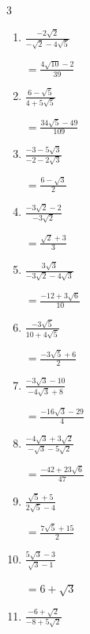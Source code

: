 \begin{multicols}{3}
\begin{enumerate}
        $\displaystyle =\frac{7\sqrt{2}-9}{5}$

  \item $\displaystyle \frac{-2\sqrt{2}}{-\sqrt{2}-4\sqrt{5}}$

        $\displaystyle =\frac{4\sqrt{10}-2}{39}$

\columnbreak %

\resetques

  \item $\displaystyle \frac{6-\sqrt{5}}{4+5\sqrt{5}}$

        $\displaystyle =\frac{34\sqrt{5}-49}{109}$

  \item $\displaystyle \frac{-3-5\sqrt{3}}{-2-2\sqrt{3}}$

        $\displaystyle =\frac{6-\sqrt{3}}{2}$

  \item $\displaystyle \frac{-3\sqrt{2}-2}{-3\sqrt{2}}$

        $\displaystyle =\frac{\sqrt{2}+3}{3}$

  \item $\displaystyle \frac{3\sqrt{3}}{-3\sqrt{2}-4\sqrt{3}}$

        $\displaystyle =\frac{-12+3\sqrt{6}}{10}$

  \item $\displaystyle \frac{-3\sqrt{5}}{10+4\sqrt{5}}$

        $\displaystyle =\frac{-3\sqrt{5}+6}{2}$

\columnbreak %

  \item $\displaystyle \frac{-3\sqrt{3}-10}{-4\sqrt{3}+8}$

        $\displaystyle =\frac{-16\sqrt{3}-29}{4}$

  \item $\displaystyle \frac{-4\sqrt{3}+3\sqrt{2}}{-\sqrt{3}-5\sqrt{2}}$

        $\displaystyle =\frac{-42+23\sqrt{6}}{47}$

  \item $\displaystyle \frac{\sqrt{5}+5}{2\sqrt{5}-4}$

        $\displaystyle =\frac{7\sqrt{5}+15}{2}$

  \item $\displaystyle \frac{5\sqrt{3}-3}{\sqrt{3}-1}$

        $\displaystyle =6+\sqrt{3}$

  \item $\displaystyle \frac{-6+\sqrt{2}}{-8+5\sqrt{2}}$


\end{enumerate}
\end{multicols}
